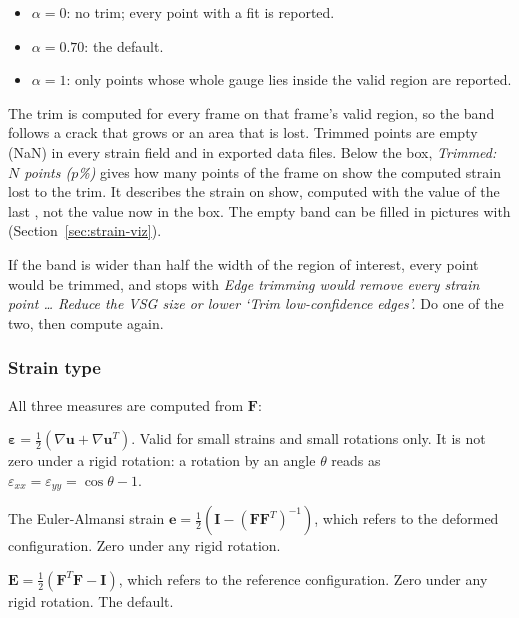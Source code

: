 \begin{itemize}
  \item $\alpha = 0$: no trim; every point with a fit is reported.
  \item $\alpha = 0.70$: the default.
  \item $\alpha = 1$: only points whose whole gauge lies inside the valid region are reported.
\end{itemize}

The trim is computed for every frame on that frame's valid region, so the band follows a crack
that grows or an area that is lost. Trimmed points are empty (NaN) in every strain field and in
exported data files. Below the box, \emph{Trimmed: $N$ points ($p$\%)} gives how many points of
the frame on show the computed strain lost to the trim. It describes the strain on show, computed
with the value of the last , not the value now in the box. The empty band can
be filled in pictures with  (Section~\ref{sec:strain-viz}).

\begin{warnbox}
If the band is wider than half the width of the region of interest, every point would be
trimmed, and  stops with \emph{Edge trimming would remove every strain point
\ldots{} Reduce the VSG size or lower `Trim low-confidence edges'.} Do one of the two, then
compute again.
\end{warnbox}

\subsubsection*{Strain type}

All three measures are computed from $\mathbf{F}$:

\begin{description}[leftmargin=1.2cm,style=nextline]
  \item[Infinitesimal]
    $\boldsymbol{\varepsilon} = \tfrac12\left(\nabla\mathbf{u} + \nabla\mathbf{u}^{T}\right)$.
    Valid for small strains and small rotations only. It is not zero under a rigid rotation: a
    rotation by an angle $\theta$ reads as
    $\varepsilon_{xx} = \varepsilon_{yy} = \cos\theta - 1$.
  \item[Eulerian]
    The Euler-Almansi strain
    $\mathbf{e} = \tfrac12\left(\mathbf{I} - (\mathbf{F}\mathbf{F}^{T})^{-1}\right)$, which
    refers to the deformed configuration. Zero under any rigid rotation.
  \item[Green-Lagrange]
    $\mathbf{E} = \tfrac12\left(\mathbf{F}^{T}\mathbf{F} - \mathbf{I}\right)$, which refers to
    the reference configuration. Zero under any rigid rotation. The default.
\end{description}


